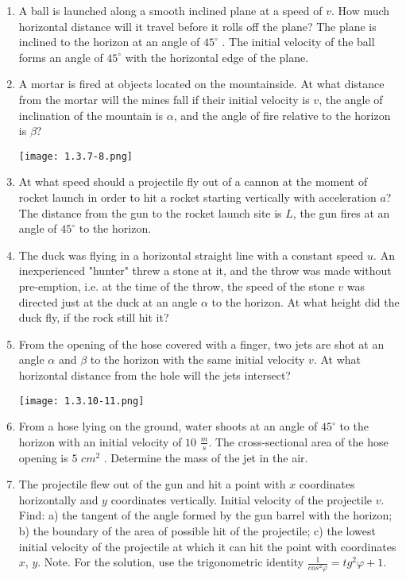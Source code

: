 \documentclass{article}
\begin{document}
\begin{enumerate}[label=1.3.\arabic*]
\item A ball is launched along a smooth inclined plane at a speed of $v$. How much horizontal distance will it travel before it rolls off the plane? The plane is inclined to the horizon at an angle of $45^\circ$ . The initial velocity of the ball forms an angle of $45^\circ$ with the horizontal edge of the plane.

\item A mortar is fired at objects located on the mountainside. At what distance from the mortar will the mines fall if their initial velocity is $v$, the angle of inclination of the mountain is $\alpha$, and the angle of fire relative to the horizon is $\beta$?

\begin{center}
    \texttt{[image: 1.3.7-8.png]}
\end{center}

\item At what speed should a projectile fly out of a cannon at the moment of rocket launch in order to hit a rocket starting vertically with acceleration $a$? The distance from the gun to the rocket launch site is $L$, the gun fires at an angle of $45^\circ$ to the horizon.

\item The duck was flying in a horizontal straight line with a constant speed $u$. An inexperienced "hunter" threw a stone at it, and the throw was made without pre-emption, i.e. at the time of the throw, the speed of the stone $v$ was directed just at the duck at an angle $\alpha$ to the horizon. At what height did the duck fly, if the rock still hit it? 

\item From the opening of the hose covered with a finger, two jets are shot at an angle $\alpha$ and $\beta$ to the horizon with the same initial velocity $v$. At what horizontal distance from the hole will the jets intersect?

\begin{center}
    \texttt{[image: 1.3.10-11.png]}
\end{center}

\item From a hose lying on the ground, water shoots at an angle of $45^\circ$ to the horizon with an initial velocity of $10$ $\frac{m}{s}$. The cross-sectional area of the hose opening is $5$ $cm^2$ . Determine the mass of the jet in the air.

\item The projectile flew out of the gun and hit a point with $x$ coordinates horizontally and $y$ coordinates vertically. Initial velocity of the projectile $v$. Find: a) the tangent of the angle formed by the gun barrel with the horizon; b) the boundary of the area of possible hit of the projectile; c) the lowest initial velocity of the projectile at which it can hit the point with coordinates $x$, $y$. Note. For the solution, use the trigonometric identity $\frac{1}{cos^2 \varphi} = tg^2 \varphi + 1$.


\end{enumerate}
\end{document}
